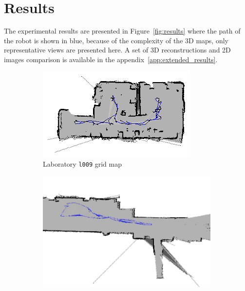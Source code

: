 \section{Results}
\label{sec:results}

The experimental results are presented in Figure~\ref{fig:results} where the path of the robot is shown in blue, because of the complexity of the 3D maps, only representative views are presented here. A set of 3D reconstructions and 2D images comparison is available in the appendix~\ref{app:extended_results}.

\begin{figure}[H]
  \centering
  \begin{subfigure}[b]{0.45\textwidth}
    \centering
    \includegraphics[width=\textwidth]{imgs/gridlab.png}
    \caption{Laboratory \texttt{l009} grid map}
    \label{fig:results_lab2d}
  \end{subfigure}
  \begin{subfigure}[b]{0.45\textwidth}
    \centering
    \includegraphics[width=\textwidth]{imgs/gridcorri.png}

\end{subfigure}
\end{figure}
